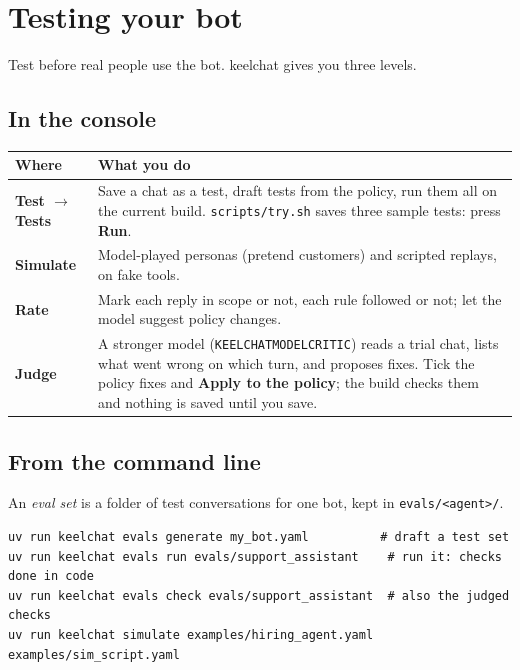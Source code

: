 \documentclass[11pt,a4paper]{article}
\newcommand{\codeus}{\textunderscore\allowbreak}
\newcommand{\code}[1]{{\renewcommand{\_}{\codeus}\texttt{\upshape #1}}}
\begin{document}
\section{Testing your bot}

Test before real people use the bot. keelchat gives you three levels.

\subsection{In the console}

\begin{center}
\small
\begin{tabularx}{\textwidth}{@{}L{3.0cm}Y@{}}
\toprule
\textbf{Where} & \textbf{What you do} \\
\midrule
\textbf{Test $\rightarrow$ Tests} & Save a chat as a test, draft tests from the policy, run them all on the current
  build. \code{scripts/try.sh} saves three sample tests: press \textbf{Run}. \\
\textbf{Simulate} & Model-played personas (pretend customers) and scripted replays, on fake tools. \\
\textbf{Rate} & Mark each reply in scope or not, each rule followed or not; let the model suggest policy changes. \\
\textbf{Judge} & A stronger model (\code{KEELCHAT\_MODEL\_CRITIC}) reads a trial chat, lists what went wrong on which
  turn, and proposes fixes. Tick the policy fixes and \textbf{Apply to the policy}; the build checks them and nothing
  is saved until you save. \\
\bottomrule
\end{tabularx}
\end{center}

\subsection{From the command line}

An \emph{eval set} is a folder of test conversations for one bot, kept in \code{evals/<agent>/}.

\begin{lstlisting}[style=bashstyle]
uv run keelchat evals generate my_bot.yaml          # draft a test set
uv run keelchat evals run evals/support_assistant    # run it: checks done in code
uv run keelchat evals check evals/support_assistant  # also the judged checks
uv run keelchat simulate examples/hiring_agent.yaml examples/sim_script.yaml
\end{lstlisting}
\end{document}
